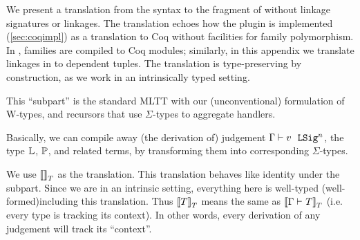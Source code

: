 We present a translation from the \TT syntax to the fragment of \TT without
linkage signatures or linkages.
The translation echoes how the \Lang plugin is implemented (\cref{sec:coqimpl})
as a translation to Coq without facilities for family polymorphism.
In \Lang, families are compiled to Coq modules; similarly, in this appendix
we translate linkages in \TT to dependent tuples.
The translation is type-preserving by construction, as we work in an
intrinsically typed setting.

This ``subpart'' is the standard MLTT with our
(unconventional) formulation of W-types,
and recursors that use $\Sigma$-types to aggregate handlers.

Basically, we can compile away (the derivation of) judgement $ {\Gamma} \vdash {v} \ \ \texttt{LSig}^{n} $,
the type $\mathbb{L}$, $\mathbb{P}$, and related terms, by transforming them into
corresponding $\Sigma$-types.

 


We use ${{\llbracket {} \rrbracket}_T}$ as the translation. This translation behaves like identity
under the subpart. Since we are in an intrinsic setting, everything here
is well-typed (well-formed)including this translation. Thus
${{\llbracket {T} \rrbracket}_T}$ means the same as ${{\llbracket {\ensuremath{ {\Gamma} \vdash_{} {T} }} \rrbracket}_T}$
(i.e. every type is tracking its context). In other words, every
derivation of any judgement will track its ``context''. 


